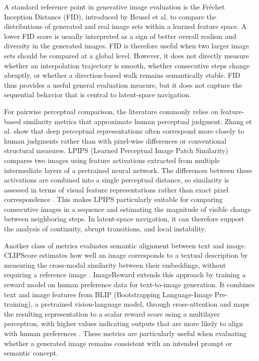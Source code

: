 A standard reference point in generative image evaluation is the Fréchet Inception Distance (FID), introduced by Heusel et al. to compare the distributions of generated and real image sets within a learned feature space. A lower FID score is usually interpreted as a sign of better overall realism and diversity in the generated images. FID is therefore useful when two larger image sets should be compared at a global level. However, it does not directly measure whether an interpolation trajectory is smooth, whether consecutive steps change abruptly, or whether a direction-based walk remains semantically stable. FID thus provides a useful general evaluation measure, but it does not capture the sequential behavior that is central to latent-space navigation. \cite{heusel2017ttur}

For pairwise perceptual comparison, the literature commonly relies on feature-based similarity metrics that approximate human perceptual judgment. Zhang et al. show that deep perceptual representations often correspond more closely to human judgments rather than with pixel-wise differences or conventional structural measures. LPIPS (Learned Perceptual Image Patch Similarity) compares two images using feature activations extracted from multiple intermediate layers of a pretrained neural network. The differences between these activations are combined into a single perceptual distance, so similarity is assessed in terms of visual feature representations rather than exact pixel correspondence \cite{zhang2018lpips}. This makes LPIPS particularly suitable for comparing consecutive images in a sequence and estimating the magnitude of visible change between neighboring steps. In latent-space navigation, it can therefore support the analysis of continuity, abrupt transitions, and local instability.

Another class of metrics evaluates semantic alignment between text and image. CLIPScore estimates how well an image corresponds to a textual description by measuring the cross-modal similarity between their embeddings, without requiring a reference image \cite{hessel2022clipscore}. ImageReward extends this approach by training a reward model on human preference data for text-to-image generation. It combines text and image features from BLIP (Bootstrapping Language-Image Pre-training), a pretrained vision-language model, through cross-attention and maps the resulting representation to a scalar reward score using a multilayer perceptron, with higher values indicating outputs that are more likely to align with human preferences \cite{xu2023imagereward}. These metrics are particularly useful when evaluating whether a generated image remains consistent with an intended prompt or semantic concept.

